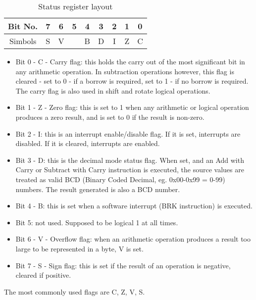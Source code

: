 \documentclass{article}
\begin{document}
  \begin{table}[h!]
  \centering
  \begin{tabular}{c c c c c c c c c}
    Bit No. & 7 & 6 & 5 & 4 & 3 & 2 & 1 & 0 \\
    \hline
    Simbols & S & V &   & B & D & I & Z & C \\
  \end{tabular}
  \caption{Status register layout}
  \end{table}
  \begin{itemize}
   \item Bit 0 - C - Carry flag: this holds the carry out of the most significant
   bit in any arithmetic operation. In subtraction operations however, this
   flag is cleared - set to 0 - if a borrow is required, set to 1 - if no
   borrow is required. The carry flag is also used in shift and rotate
   logical operations.

   \item Bit 1 - Z - Zero flag: this is set to 1 when any arithmetic or logical
   operation produces a zero result, and is set to 0 if the result is
   non-zero.

   \item Bit 2 - I: this is an interrupt enable/disable flag. If it is set,
   interrupts are disabled. If it is cleared, interrupts are enabled.

   \item Bit 3 - D: this is the decimal mode status flag. When set, and an Add with
   Carry or Subtract with Carry instruction is executed, the source values are
   treated as valid BCD (Binary Coded Decimal, eg. 0x00-0x99 = 0-99) numbers.
   The result generated is also a BCD number.

   \item Bit 4 - B: this is set when a software interrupt (BRK instruction) is
   executed.

   \item Bit 5: not used. Supposed to be logical 1 at all times.

   \item Bit 6 - V - Overflow flag: when an arithmetic operation produces a result
   too large to be represented in a byte, V is set.

   \item Bit 7 - S - Sign flag: this is set if the result of an operation is
   negative, cleared if positive.
  \end{itemize}

   The most commonly used flags are C, Z, V, S.
\end{document}
